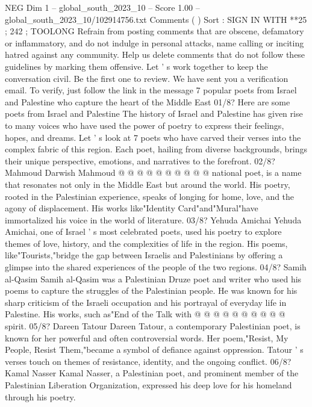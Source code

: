 \begin{textsample}{NEG Dim 1 – global\_south\_2023\_10 – Score 1.00 – global\_south\_2023\_10/102914756.txt}  \label{ex:f1_neg_268}
Comments ( ) Sort : SIGN IN WITH **25 ; 242 ; TOOLONG Refrain from posting comments that are obscene, defamatory or inflammatory, and do not indulge in personal attacks, name calling or inciting hatred against any community.
Help us delete comments that do not follow these guidelines by marking them offensive.
Let ' s work together to keep the conversation civil.
Be the first one to review.
We have sent you a verification email.
To verify, just follow the link in the message 7 popular poets from Israel and Palestine who capture the heart of the Middle East 01/8?
Here are some poets from Israel and Palestine The history of Israel and Palestine has given rise to many voices who have used the power of poetry to express their feelings, hopes, and dreams.
Let ' s look at 7 poets who have carved their verses into the complex fabric of this region.
Each poet, hailing from diverse backgrounds, brings their unique perspective, emotions, and narratives to the forefront. 02/8?
Mahmoud Darwish Mahmoud @ @ @ @ @ @ @ @ @ @ national poet, is a name that resonates not only in the Middle East but around the world.
His poetry, rooted in the Palestinian experience, speaks of longing for home, love, and the agony of displacement.
His works like"Identity Card"and"Mural"have immortalized his voice in the world of literature. 03/8?
Yehuda Amichai Yehuda Amichai, one of Israel ' s most celebrated poets, used his poetry to explore themes of love, history, and the complexities of life in the region.
His poems, like"Tourists,"bridge the gap between Israelis and Palestinians by offering a glimpse into the shared experiences of the people of the two regions. 04/8?
Samih al-Qasim Samih al-Qasim was a Palestinian Druze poet and writer who used his poems to capture the struggles of the Palestinian people.
He was known for his sharp criticism of the Israeli occupation and his portrayal of everyday life in Palestine.
His works, such as"End of the Talk with @ @ @ @ @ @ @ @ @ @ spirit. 05/8?
Dareen Tatour Dareen Tatour, a contemporary Palestinian poet, is known for her powerful and often controversial words.
Her poem,"Resist, My People, Resist Them,"became a symbol of defiance against oppression.
Tatour ' s verses touch on themes of resistance, identity, and the ongoing conflict. 06/8?
Kamal Nasser Kamal Nasser, a Palestinian poet, and prominent member of the Palestinian Liberation Organization, expressed his deep love for his homeland through his poetry.

\end{textsample}
